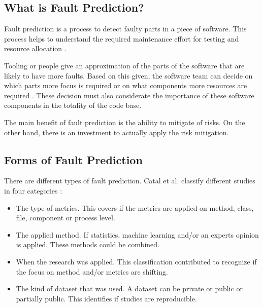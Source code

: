 \subsection*{What is Fault Prediction?}

Fault prediction is a process to detect faulty parts in a piece of software.
This process helps to understand the required maintenance effort for testing and resource allocation \autocite[415]{MAKING_SOFTWARE}.

Tooling or people give an approximation of the parts of the software that are likely to have more faults.
Based on this given, the software team can decide on which parts more focus is required or on what components more resources are required \autocite[415-416]{MAKING_SOFTWARE}.
These decision must also considerate the importance of these software components in the totality of the code base.

The main benefit of fault prediction is the ability to mitigate of risks.
On the other hand, there is an investment to actually apply the risk mitigation.

\subsection*{Forms of Fault Prediction}

There are different types of fault prediction. Catal et al. classify different studies in four categories \autocite{Catal20097346}:
\begin{itemize}
\setlength\itemsep{0em}
\item The type of metrics. This covers if the metrics are applied on method, class, file, component or process level.
\item The applied method. If statistics, machine learning and/or an experts opinion is applied. These methods could be combined.
\item When the research was applied. This classification contributed to recognize if the focus on method and/or metrics are shifting.
\item The kind of dataset that was used. A dataset can be private or public or partially public. This identifies if studies are reproducible.
\end{itemize}

